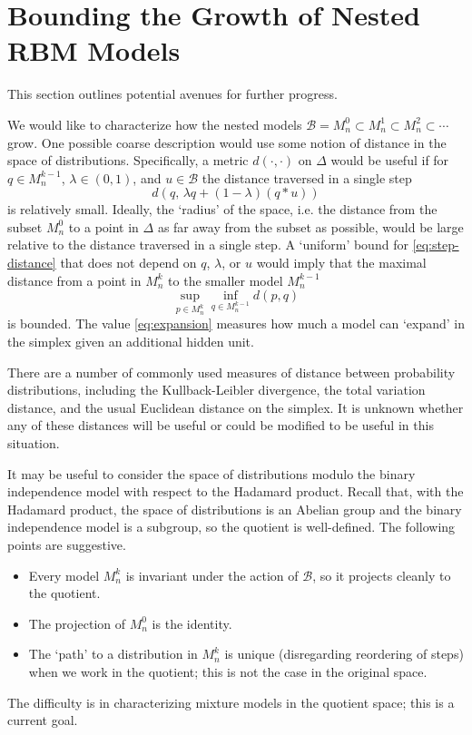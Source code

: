 \documentclass[cclicense]{hmcthesis}
\newcommand*{\Bin}{\mathcal{B}}
\numberwithin{equation}{section}
\begin{document}
\section{Bounding the Growth of Nested RBM Models}

    This section outlines potential avenues for further progress.

    We would like to characterize how the nested models $\Bin = M_n^0 \subset
    M_n^1 \subset M_n^2 \subset \cdots$ grow.  One possible coarse description
    would use some notion of distance in the space of distributions.
    Specifically, a metric $d(\cdot, \cdot)$ on $\Delta$ would be useful
    if for $q \in M_n^{k-1}$, $\lambda \in (0,1)$, and $u \in \Bin$ the distance
    traversed in a single step
    \begin{equation}\label{eq:step-distance}
        d(q,\, \lambda q + (1 - \lambda)(q * u))
    \end{equation}
    is relatively small.  Ideally, the `radius' of the space, i.e. the distance
    from the subset $M_n^0$ to a point in $\Delta$ as far away from the subset
    as possible, would be large relative to the distance traversed in a single
    step.  A `uniform' bound for \eqref{eq:step-distance} that does not depend
    on $q$, $\lambda$, or $u$ would imply that the maximal distance from a point
    in $M_n^k$ to the smaller model $M_n^{k-1}$
    \begin{equation}\label{eq:expansion}
        \sup_{p \in M_n^k}
        \inf_{q \in M_n^{k-1}} d(p, q)
    \end{equation}
    is bounded.  The value \eqref{eq:expansion} measures how much a model can
    `expand' in the simplex given an additional hidden unit. 
    
    There are a number of commonly used
    measures of distance between probability distributions, including the
    Kullback-Leibler divergence, the total variation distance, and the usual
    Euclidean distance on the simplex.  It is unknown whether any of these
    distances will be useful or could be modified to be useful in this
    situation.

    It may be useful to consider the space of distributions modulo the binary
    independence model with respect to the Hadamard product.  Recall that, with
    the Hadamard product, the space of distributions is an Abelian group and the
    binary independence model is a subgroup, so the quotient is well-defined.
    The following points are suggestive.
    \begin{itemize}\nospace
        \item Every model $M_n^k$ is invariant under the action of $\Bin$, so
        it projects cleanly to the quotient.
        \item The projection of $M_n^0$ is the identity.
        \item The `path' to a distribution in $M_n^k$ is unique (disregarding
        reordering of steps) when we work in the quotient; this is not the case
        in the original space.
    \end{itemize}
    The difficulty is in characterizing mixture models in the quotient space; this
    is a current goal.
    
\end{document}
